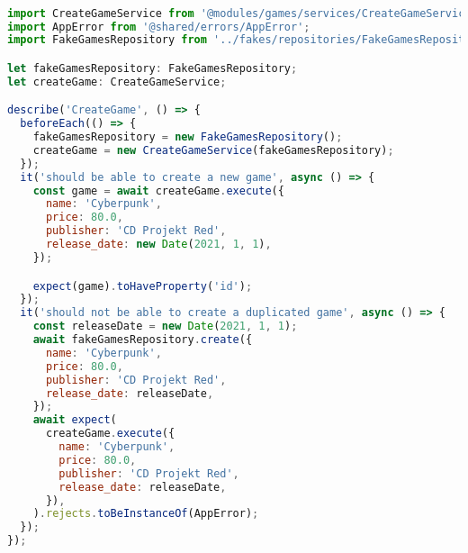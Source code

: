 \begin{lstlisting}[language=JavaScript, caption={CreateGameService.spec.ts},captionpos=b, label=alg:creategametest]

import CreateGameService from '@modules/games/services/CreateGameService';
import AppError from '@shared/errors/AppError';
import FakeGamesRepository from '../fakes/repositories/FakeGamesRepository';

let fakeGamesRepository: FakeGamesRepository;
let createGame: CreateGameService;

describe('CreateGame', () => {
  beforeEach(() => {
    fakeGamesRepository = new FakeGamesRepository();
    createGame = new CreateGameService(fakeGamesRepository);
  });
  it('should be able to create a new game', async () => {
    const game = await createGame.execute({
      name: 'Cyberpunk',
      price: 80.0,
      publisher: 'CD Projekt Red',
      release_date: new Date(2021, 1, 1),
    });

    expect(game).toHaveProperty('id');
  });
  it('should not be able to create a duplicated game', async () => {
    const releaseDate = new Date(2021, 1, 1);
    await fakeGamesRepository.create({
      name: 'Cyberpunk',
      price: 80.0,
      publisher: 'CD Projekt Red',
      release_date: releaseDate,
    });
    await expect(
      createGame.execute({
        name: 'Cyberpunk',
        price: 80.0,
        publisher: 'CD Projekt Red',
        release_date: releaseDate,
      }),
    ).rejects.toBeInstanceOf(AppError);
  });
});
\end{lstlisting}